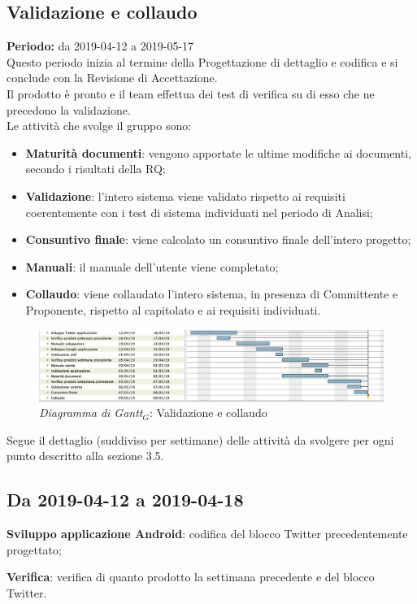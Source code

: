 \begin{flushleft}
\newpage
\section{Validazione e collaudo}
\label{Validazione}
\textbf{Periodo:} da 2019-04-12 a 2019-05-17\\
Questo periodo inizia al termine della Progettazione di dettaglio e codifica e si conclude con la Revisione di Accettazione.\\
Il prodotto è pronto e il team effettua dei test di verifica su di esso che ne precedono la validazione.\\
Le attività che svolge il gruppo sono:
\begin{itemize}
   \item \textbf{Maturità documenti}: vengono apportate le ultime modifiche ai documenti, secondo i risultati della RQ;
   \item \textbf{Validazione}: l'intero sistema viene validato rispetto ai requisiti coerentemente con i test di sistema individuati nel periodo di Analisi;
   \item \textbf{Consuntivo finale}: viene calcolato un consuntivo finale dell'intero progetto;
   \item \textbf{Manuali}: il manuale dell'utente viene completato;
   \item \textbf{Collaudo}: viene collaudato l'intero sistema, in presenza di Committente e Proponente, rispetto al capitolato e ai requisiti individuati. 
\end{itemize}
\begin{figure} [h]
    \centering
    \includegraphics[scale=0.29]{./images/ZeroSevenGanttValidazione.png}
    \caption{\textit{Diagramma di Gantt$_{G}$}: Validazione e collaudo }\label{G5}
\end{figure}
Segue il dettaglio (suddiviso per settimane) delle attività da svolgere per ogni punto descritto alla sezione 3.5.
\subsection{Da 2019-04-12 a 2019-04-18}
	\item \textbf{Sviluppo applicazione Android}: codifica del blocco Twitter precedentemente progettato;
	\item \textbf{Verifica}: verifica di quanto prodotto la settimana precedente e del blocco Twitter.

\end{flushleft}
